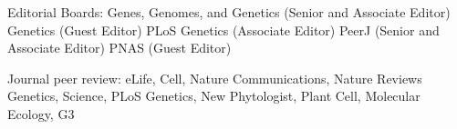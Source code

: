 \documentclass[letterpaper,10pt]{article}
\newcommand{\ignore}[1]{}
\renewenvironment{itemize}{
  \begin{list}{}{
    \setlength{\leftmargin}{1.5em}
  }
}{
  \end{list}
}
\begin{document}
\begin{itemize}
\item Editorial Boards:
Genes, Genomes, and Genetics (Senior and Associate Editor)%
Genetics (Guest Editor) %
PLoS Genetics (Associate Editor)%
PeerJ (Senior and Associate Editor)%
PNAS (Guest Editor) %
\item Journal peer review: \ignore{10/18,1/19,11/19} eLife,  \ignore{2/20} Cell, \ignore{7/19} Nature Communications, \ignore{2/19} Nature Reviews Genetics,   \ignore{7/19} Science, \ignore{8/19} PLoS Genetics, \ignore{ 7/19} New Phytologist,  \ignore{4/20} Plant Cell, \ignore{7/19} Molecular Ecology, G3

\end{itemize}
\end{document}
